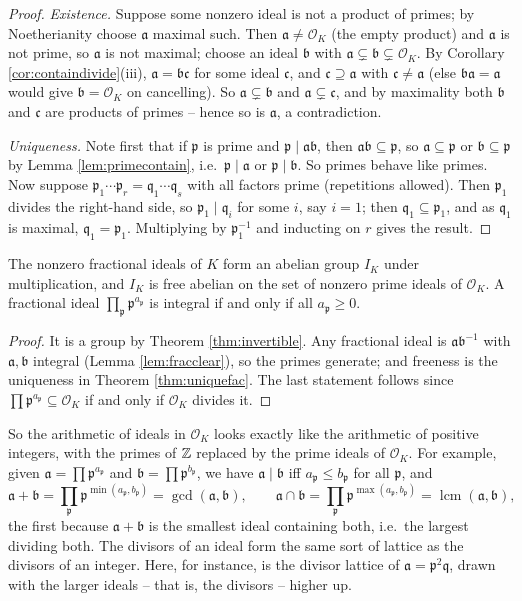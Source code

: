 \documentclass[a4paper]{scrartcl}
\renewcommand{\OO}{\mathcal{O}}
\newcommand{\fa}{\mathfrak{a}}
\newcommand{\fb}{\mathfrak{b}}
\newcommand{\fc}{\mathfrak{c}}
\newcommand{\fp}{\mathfrak{p}}
\newcommand{\fq}{\mathfrak{q}}
\begin{document}
\begin{proof}
	\emph{Existence.} Suppose some nonzero ideal is not a product of primes; by Noetherianity choose $\fa$ maximal such. Then $\fa \neq \OO_K$ (the empty product) and $\fa$ is not prime, so $\fa$ is not maximal; choose an ideal $\fb$ with $\fa \subsetneq \fb \subsetneq \OO_K$. By Corollary \ref{cor:containdivide}(iii), $\fa = \fb\fc$ for some ideal $\fc$, and $\fc \supseteq \fa$ with $\fc \neq \fa$ (else $\fb\fa = \fa$ would give $\fb = \OO_K$ on cancelling). So $\fa \subsetneq \fb$ and $\fa \subsetneq \fc$, and by maximality both $\fb$ and $\fc$ are products of primes -- hence so is $\fa$, a contradiction.

	\emph{Uniqueness.} Note first that if $\fp$ is prime and $\fp \mid \fa\fb$, then $\fa\fb \subseteq \fp$, so $\fa \subseteq \fp$ or $\fb \subseteq \fp$ by Lemma \ref{lem:primecontain}, i.e.\ $\fp\mid\fa$ or $\fp\mid\fb$. So primes behave like primes. Now suppose $\fp_1\cdots\fp_r = \fq_1\cdots\fq_s$ with all factors prime (repetitions allowed). Then $\fp_1$ divides the right-hand side, so $\fp_1 \mid \fq_i$ for some $i$, say $i=1$; then $\fq_1 \subseteq \fp_1$, and as $\fq_1$ is maximal, $\fq_1 = \fp_1$. Multiplying by $\fp_1^{-1}$ and inducting on $r$ gives the result.
\end{proof}

\begin{corollary}\label{cor:IKfree}
	The nonzero fractional ideals of $K$ form an abelian group $I_K$ under multiplication, and $I_K$ is free abelian on the set of nonzero prime ideals of $\OO_K$. A fractional ideal $\prod_\fp \fp^{a_\fp}$ is integral if and only if all $a_\fp \geq 0$.
\end{corollary}

\begin{proof}
	It is a group by Theorem \ref{thm:invertible}. Any fractional ideal is $\fa\fb^{-1}$ with $\fa, \fb$ integral (Lemma \ref{lem:fracclear}), so the primes generate; and freeness is the uniqueness in Theorem \ref{thm:uniquefac}. The last statement follows since $\prod\fp^{a_\fp} \subseteq \OO_K$ if and only if $\OO_K$ divides it.
\end{proof}

So the arithmetic of ideals in $\OO_K$ looks exactly like the arithmetic of positive integers, with the primes of $\mathbb{Z}$ replaced by the prime ideals of $\OO_K$. For example, given $\fa = \prod\fp^{a_\fp}$ and $\fb = \prod\fp^{b_\fp}$, we have $\fa \mid \fb$ iff $a_\fp \leq b_\fp$ for all $\fp$, and
$$\fa + \fb = \prod_\fp \fp^{\min(a_\fp,b_\fp)} = \gcd(\fa,\fb), \qquad \fa \cap \fb = \prod_\fp \fp^{\max(a_\fp,b_\fp)} = \operatorname{lcm}(\fa,\fb),$$
the first because $\fa+\fb$ is the smallest ideal containing both, i.e.\ the largest dividing both. The divisors of an ideal form the same sort of lattice as the divisors of an integer. Here, for instance, is the divisor lattice of $\fa = \fp^2\fq$, drawn with the larger ideals -- that is, the divisors -- higher up.
\end{document}
